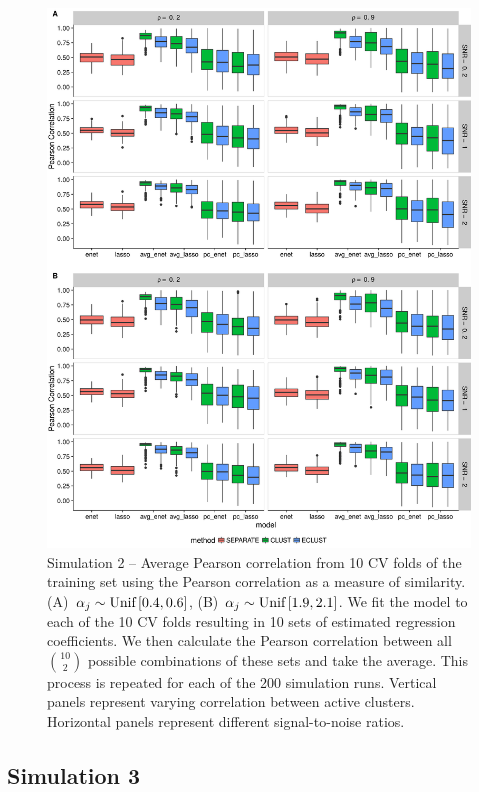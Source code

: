 \begin{appendices}
\begin{figure}[H]
	\centering
	\includegraphics[scale=0.55, keepaspectratio]{./figs/hydra/results/figures/sim2-sept8/pearson_Correlation_sim2.png}
	\caption{Simulation 2 -- Average Pearson correlation from 10 CV folds of the training set using the Pearson correlation as a measure of similarity. \mbox{(A) $\alpha_{j} \sim \textrm{{Unif}}\left[0.4, 0.6\right]$}, \mbox{(B) $\alpha_{j} \sim \textrm{{Unif}}\left[1.9, 2.1\right]$}. We fit the model to each of the 10 CV folds resulting in 10 sets of estimated regression coefficients. We then calculate the Pearson correlation between all $\binom{10}{2}$ possible combinations of these sets and take the average. This process is repeated for each of the 200 simulation runs. Vertical panels represent varying correlation between active clusters. Horizontal panels represent different signal-to-noise ratios.}
	\label{fig:pearson_Correlation_sim2}
\end{figure}



\subsection*{Simulation 3}


\end{appendices}

